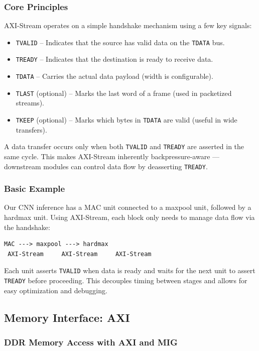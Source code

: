 \documentclass{article}
\begin{document}
\subsubsection*{Core Principles}

AXI-Stream operates on a simple handshake mechanism using a few key signals:

\begin{itemize}
  \item \texttt{TVALID} – Indicates that the source has valid data on the \texttt{TDATA} bus.
  \item \texttt{TREADY} – Indicates that the destination is ready to receive data.
  \item \texttt{TDATA} – Carries the actual data payload (width is configurable).
  \item \texttt{TLAST} (optional) – Marks the last word of a frame (used in packetized streams).
  \item \texttt{TKEEP} (optional) – Marks which bytes in \texttt{TDATA} are valid (useful in wide transfers).
\end{itemize}

A data transfer occurs only when both \texttt{TVALID} and \texttt{TREADY} are asserted in the same cycle. This makes AXI-Stream inherently backpressure-aware — downstream modules can control data flow by deasserting \texttt{TREADY}.

\subsubsection*{Basic Example}

Our CNN inference has a MAC unit connected to a maxpool unit, followed by a hardmax unit. Using AXI-Stream, each block only needs to manage data flow via the handshake:

\begin{verbatim}
MAC ---> maxpool ---> hardmax
 AXI-Stream     AXI-Stream     AXI-Stream
\end{verbatim}

Each unit asserts \texttt{TVALID} when data is ready and waits for the next unit to assert \texttt{TREADY} before proceeding. This decouples timing between stages and allows for easy optimization and debugging.

\subsection{Memory Interface: AXI}
\subsubsection*{DDR Memory Access with AXI and MIG}
\end{document}
